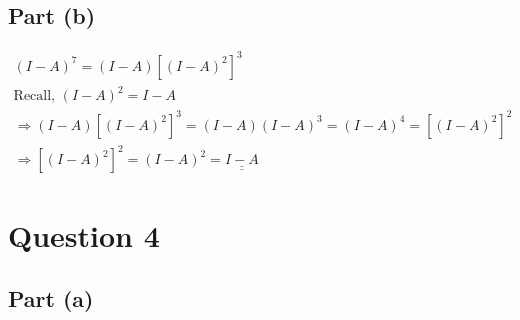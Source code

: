 \documentclass[letterpaper,10pt]{article}
\newcommand{\doubleu}[1]{\underline{\underline{#1}}}
\begin{document}
		\subsection{Part (b)}
			\begin{gather*}
				(I-A)^7 = (I-A)\left[(I-A)^2\right]^3 \\
				\text{Recall, } (I-A)^2 = I-A \\
				\Rightarrow (I-A)[(I-A)^2]^3 = (I-A)(I-A)^3 = (I-A)^4 = [(I-A)^2]^2 \\
				\Rightarrow [(I-A)^2]^2 = (I-A)^2 = \doubleu{I-A}
			\end{gather*}


	\section{Question 4}
		\subsection{Part (a)}
\end{document}
